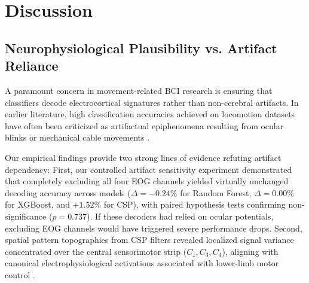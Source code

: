 \documentclass[review,12pt]{elsarticle}
\begin{document}
\section{Discussion}
\label{sec:discussion}

\subsection{Neurophysiological Plausibility vs. Artifact Reliance}
A paramount concern in movement-related BCI research is ensuring that classifiers decode electrocortical signatures rather than non-cerebral artifacts. In earlier literature, high classification accuracies achieved on locomotion datasets have often been criticized as artifactual epiphenomena resulting from ocular blinks or mechanical cable movements \cite{castermans2014accidental, tanner2023artifacts}.

Our empirical findings provide two strong lines of evidence refuting artifact dependency:
First, our controlled artifact sensitivity experiment demonstrated that completely excluding all four EOG channels yielded virtually unchanged decoding accuracy across models ($\Delta = -0.24\%$ for Random Forest, $\Delta = 0.00\%$ for XGBoost, and $+1.52\%$ for CSP), with paired hypothesis tests confirming non-significance ($p = 0.737$). If these decoders had relied on ocular potentials, excluding EOG channels would have triggered severe performance drops.
Second, spatial pattern topographies from CSP filters revealed localized signal variance concentrated over the central sensorimotor strip ($C_z, C_3, C_4$), aligning with canonical electrophysiological activations associated with lower-limb motor control \cite{gwin2011electrocortical, luu2017gait}.
\end{document}
